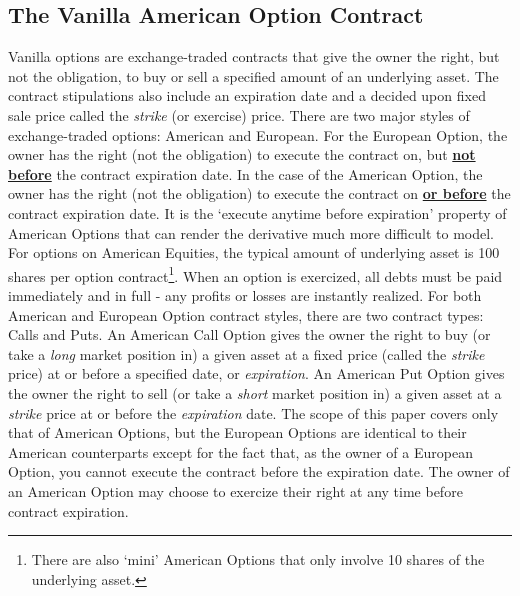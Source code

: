 \documentclass[12pt, a4paper, notitlepage]{article}
\numberwithin{equation}{subsection}
\numberwithin{figure}{subsection}
\numberwithin{table}{subsection}
\newcommand{\newpar}{\newline \newline}
\begin{document}
\subsection{The Vanilla American Option Contract}
Vanilla options are exchange-traded contracts that give the owner the right, but not the obligation, to buy or sell a specified amount of an underlying asset.  The contract stipulations also include an expiration date and a decided upon fixed sale price called the \textit{strike} (or exercise) price.  There are two major styles of exchange-traded options:  American and European.  For the European Option, the owner has the right (not the obligation) to execute the contract on, but \underline{\textbf{not before}} the contract expiration date.  In the case of the American Option, the owner has the right (not the obligation) to execute the contract on \underline{\textbf{or before}} the contract expiration date.  It is the `execute anytime before expiration' property of American Options that can render the derivative much more difficult to model.  For options on American Equities, the typical amount of underlying asset is 100 shares per option contract\footnote{There are also `mini' American Options that only involve 10 shares of the underlying asset.}.  When an option is exercized, all debts must be paid immediately and in full - any profits or losses are instantly realized.
\newpar
For both American and European Option contract styles, there are two contract types: Calls and Puts.  An American Call Option gives the owner the right to buy (or take a \textit{long} market position in) a given asset at a fixed price (called the \textit{strike} price) at or before a specified date, or \textit{expiration}.  An American Put Option gives the owner the right to sell (or take a \textit{short} market position in) a given asset at a \textit{strike} price at or before the \textit{expiration} date.  The scope of this paper covers only that of American Options, but the European Options are identical to their American counterparts except for the fact that, as the owner of a European Option, you cannot execute the contract before the expiration date.  The owner of an American Option may choose to exercize their right at any time before contract expiration.
\newpar
\end{document}
